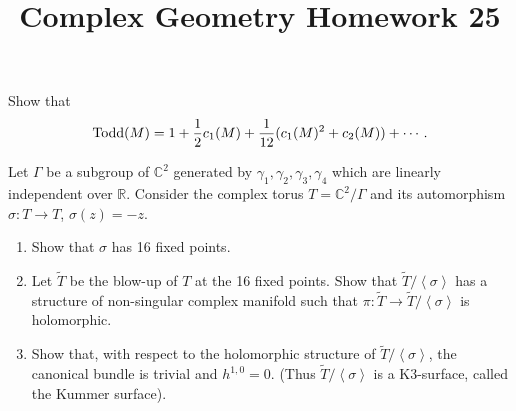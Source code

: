 \documentclass[12pt]{article}
\title{Complex Geometry Homework 25}
\author{}
\date{}
\begin{document}
\maketitle
\begin{problem}
  Show that \[
    \operatorname{Todd}(M)=1+\frac{1}{2}c_1(M)+\frac{1}{12}(c_1(M)^2+c_2(M))+\cdots
  .\] 
\end{problem}
\begin{problem}
  Let \(\Gamma\) be a subgroup of \(\mathbb{C}^2\) generated by \(\gamma_1,\gamma_2,
  \gamma_3,\gamma_4\) which are linearly independent over \(\mathbb{R}\). Consider
  the complex torus \(T=\mathbb{C}^2/\Gamma\) and its automorphism
  \(\sigma\colon T\to T\), \(\sigma(z)=-z\).
  \begin{enumerate}[(1)]
  \item Show that \(\sigma\) has 16 fixed points.
  \item Let \(\tilde{T}\) be the blow-up of \(T\) at the 16 fixed points. Show that
    \(\tilde{T}/\left<\sigma\right> \) has a structure of non-singular complex
    manifold such that \(\pi\colon\tilde{T}\to \tilde{T}/\left<\sigma\right> \) is
    holomorphic.
  \item Show that, with respect to the holomorphic structure of
    \(\tilde{T}/\left<\sigma\right> \), the canonical bundle is trivial and
    \(h^{1,0}=0\). (Thus \(\tilde{T}/\left<\sigma\right> \) is a K3-surface, called
    the Kummer surface).
  \end{enumerate}
\end{problem}
\end{document}
